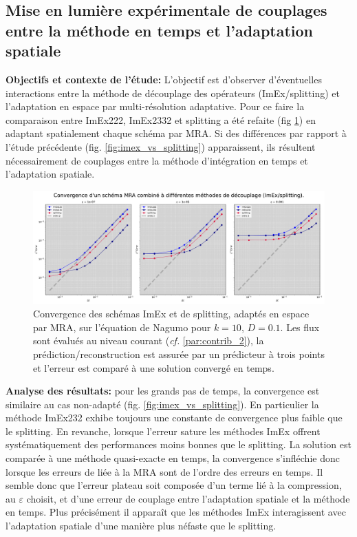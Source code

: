 \subsection{Mise en lumière expérimentale de couplages entre la méthode en temps et l'adaptation spatiale}
\label{par:couplagetempsadaptation}
\textbf{Objectifs et contexte de l'étude: }
L'objectif est d'observer d'éventuelles interactions entre la méthode de découplage des opérateurs (ImEx/splitting) et l'adaptation en espace par multi-résolution adaptative.
Pour ce faire la comparaison entre ImEx222, ImEx2332 et splitting a été refaite (fig \ref{fig:couplage-MRA-temps}) en adaptant spatialement chaque schéma par MRA.
Si des différences par rapport à l'étude précédente (fig. \ref{fig:imex_vs_splitting}) apparaissent, ils résultent nécessairement de couplages entre la méthode d'intégration en temps
et l'adaptation spatiale.\par
\begin{figure}[htbp!]
    \centering
    \includegraphics[width=\linewidth]{media/4_travail/2_nagumo/couplage/couplage_MRA_temps.pdf}
    \caption{Convergence des schémas ImEx et de splitting, adaptés en espace par MRA, sur l'équation de Nagumo pour $k=10$, $D=0.1$.
    Les flux sont évalués au niveau courant (\textit{cf.} \ref{par:contrib_2}), la prédiction/reconstruction est assurée par un prédicteur à trois points et l'erreur est comparé à une solution convergé en temps.}
    \label{fig:couplage-MRA-temps}
\end{figure}
\textbf{Analyse des résultats:} pour les grands pas de temps, la convergence est similaire au cas non-adapté (fig. \ref{fig:imex_vs_splitting}). En particulier la méthode
ImEx232 exhibe toujours une constante de convergence plus faible que le splitting. 
En revanche, lorsque l'erreur sature les méthodes ImEx offrent systématiquement des performances moins bonnes que le splitting.
La solution est comparée à une méthode quasi-exacte en temps, la convergence s'infléchie donc lorsque les erreurs de liée à la MRA sont de l'ordre des erreurs en temps.
Il semble donc que l'erreur plateau soit composée d'un terme lié à la compression, au $\varepsilon$ choisit, et d'une erreur de couplage entre l'adaptation spatiale
et la méthode en temps. Plus précisément il apparaît que les méthodes ImEx interagissent avec l'adaptation spatiale d'une manière plus néfaste que le splitting.\\
